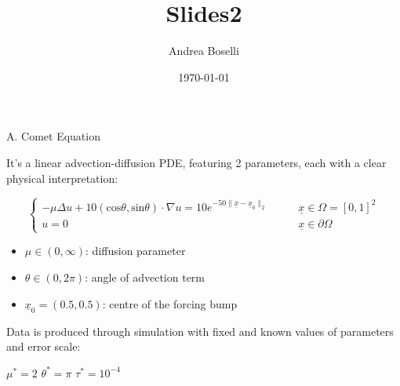 \documentclass[10pt, a4paper]{beamer}
\title     {Slides2}
\author{Andrea Boselli}
\date{\today}
\begin{document}
	
	
	\begin{frame} {A. Comet Equation}
		
		It's a linear advection-diffusion PDE, featuring 2 parameters, each with a clear physical interpretation:
		
		\begin{equation*}
			\begin{cases}
				- \mu \Delta u + 10(\text{cos}\theta, \text{sin}\theta) \cdot \nabla u = 10 e^{-50 \| \underline{x} - \underline{x}_{0}  \|_2   } \quad\quad & \underline{x} \in \Omega = \left[0,1\right]^2\\
				u = 0 & \underline{x} \in \partial \Omega
			\end{cases}	
		\end{equation*}
	
		\begin{itemize}
			
			\item $\mu \in (0,\infty)$: diffusion parameter
			\item $\theta \in (0,2\pi)$: angle of advection term
			\item$\underline{x}_0 = (0.5,0.5)$: centre of the forcing bump
			
		\end{itemize}
		
		\vspace{\baselineskip}
		Data is produced through simulation with fixed and known values of parameters and error scale:
	
		\begin{center}
			$\mu^* = 2$ \hspace{2cm} $\theta^* = \pi$ \hspace{2cm} $\tau^* = 10^{-4}$
		\end{center}
		
	\end{frame}
\end{document}
